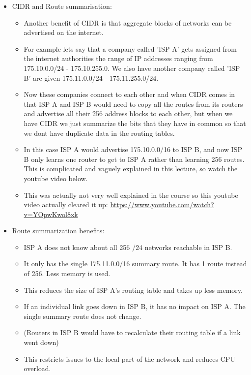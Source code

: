 \begin{itemize}
    \item CIDR and Route summarisation:
        \begin{itemize}
            \item Another benefit of CIDR is that aggregate blocks of networks can be advertised on the internet.
            \item For example lets say that a company called 'ISP A' gets assigned from the internet authorities the range of IP addresses ranging from 175.10.0.0/24 - 175.10.255.0. We also have another company called 'ISP B' are given 175.11.0.0/24 - 175.11.255.0/24.
            \item Now these companies connect to each other and when CIDR comes in that ISP A and ISP B would need to copy all the routes from its routers and advertise all their 256 address blocks to each other, but when we have CIDR we just summarize the bits that they have in common so that we dont have duplicate data in the routing tables. 
            \item In this case ISP A would advertise 175.10.0.0/16 to ISP B, and now ISP B only learns one router to get to ISP A rather than learning 256 routes. This is complicated and vaguely explained in this lecture, so watch the youtube video below.
            \item This was actually not very well explained in the course so this youtube video actually cleared it up: \url{https://www.youtube.com/watch?v=YOpwKwol8xk}
        \end{itemize}
    
    \item Route summarization benefits:
        \begin{itemize}
            \item ISP A does not know about all 256 /24 networks reachable in ISP B. 
            \item It only has the single 175.11.0.0/16 summary route. It has 1 route instead of 256. Less memory is used.
            \item This reduces the size of ISP A's routing table and takes up less memory.
            \item If an individual link goes down in ISP B, it has no impact on ISP A. The single summary route does not change.
            \item (Routers in ISP B would have to recalculate their routing table if a link went down)
            \item This restricts issues to the local part of the network and reduces CPU overload.
        \end{itemize}
\end{itemize}



